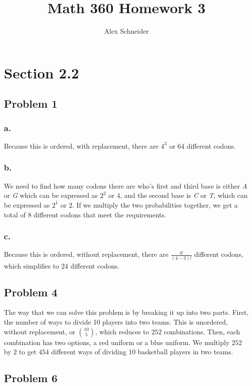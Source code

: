 \documentclass[11pt]{article}
\title{Math 360 Homework 3}
\author{Alex Schneider}
\begin{document}
\maketitle
\section*{Section 2.2}
\subsection*{Problem 1}
\subsubsection*{a.}
Because this is ordered, with replacement, there are $4^3$ or $64$ different codons. 

\subsubsection*{b.}
We need to find how many codons there are who's first and third base is either
\textit{A} or \textit{G} which can be expressed as $2^2$ or $4$, and the second base is 
\textit{C} or \textit{T}, which can be expressed as $2^1$ or $2$. If we multiply
the two probabilities together, we get a total of $8$ different codons that meet
the requirements.

\subsubsection*{c.}
Because this is ordered, without replacement, there are $\frac{4!}{(4-3)!}$
different codons, which simplifies to $24$ different codons. 

\subsection*{Problem 4}
The way that we can solve this problem is by breaking it up into two parts.
First, the number of ways to divide 10 players into two teams. This is
unordered, without replacement, or $10 \choose 5$, which reduces to $252$
combinations. Then, each combination has two options, a red uniform or a blue
uniform. We multiply $252$ by $2$ to get $454$ different ways of dividing 10
basketball players in two teams. 

\subsection*{Problem 6}
\end{document}
